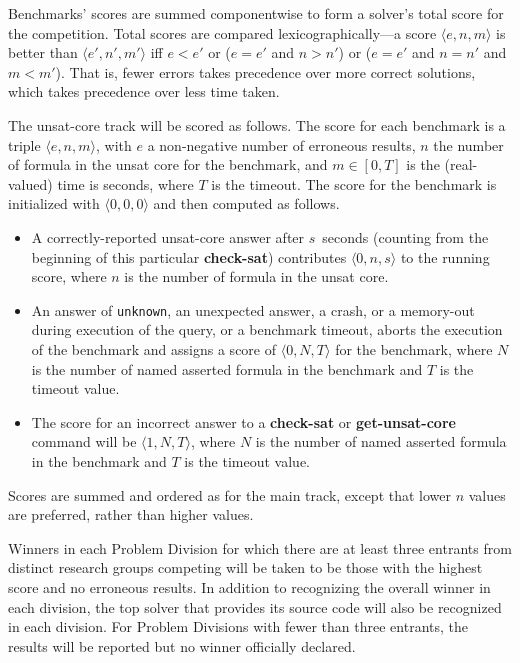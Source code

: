 \documentclass[12pt]{article}
\newcommand{\akey}[1]{\textbf{#1}}
\begin{document}
Benchmarks' scores are summed componentwise to form a solver's total
score for the competition.
Total scores are compared lexicographically---a score $\langle e,n,m\rangle$ is better than 
$\langle e',n',m'\rangle$ iff $e < e'$ or ($e = e'$ and $n > n'$) or ($e = e'$ and $n = n'$ and $m < m'$).
That is, fewer errors takes precedence over more correct solutions, which takes precedence over less time taken.


The unsat-core track will be scored as follows. The score for each benchmark is a triple $\langle e,n,m\rangle$, with
$e$ a non-negative number of erroneous results,
$n$ the number of formula in the unsat core for the benchmark,
and $m\in[0,T]$ is the (real-valued) time is seconds, where $T$ is
the timeout. 
The score for the benchmark is initialized with
$\langle0,0,0\rangle$ and then computed as follows.
\begin{itemize}
\item A correctly-reported unsat-core answer after
  $s$~seconds (counting from the beginning of this particular
  \akey{check-sat}) contributes $\langle0,n,s\rangle$ to the running
  score, where $n$ is the number of formula in the unsat core.
\item An answer of \texttt{unknown}, an unexpected answer, a crash, or a memory-out during
  execution of the query, or a benchmark timeout, aborts the execution
  of the benchmark and assigns a score of $\langle0,N,T\rangle$ for the benchmark, where
  $N$ is the number of named asserted formula in the benchmark and $T$ is the timeout value.
  
\item The score for an incorrect answer to a \akey{check-sat} or \akey{get-unsat-core} command 
  will be $\langle1,N,T\rangle$, where
  $N$ is the number of named asserted formula in the benchmark and $T$ is the timeout value.
\end{itemize}

Scores are summed and ordered as for the main track, except that lower $n$ values are preferred, rather than higher values.

Winners in each Problem Division for which there are at least three
entrants from distinct research groups competing will be taken to be
those with the highest score and no erroneous results. In addition to recognizing the overall
winner in each division, the top solver that provides its source code will also be
recognized in each division.  
For Problem Divisions with fewer than three
entrants, the results will be reported but no winner officially
declared.
\end{document}
